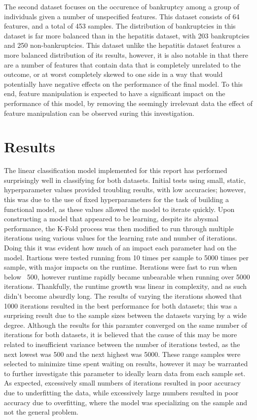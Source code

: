The second dataset focuses on the occurence of bankruptcy among a group of individuals given a number of unspecified features. This dataset consists of 64 features, and a total of 453 samples. The distribution of bankruptcies in this dataset is far more balanced than in the hepatitis dataset, with 203 bankruptcies and 250 non-bankruptcies. This dataset unlike the hepatitis dataset features a more balanced distribution of its results, however, it is also notable in that there are a number of features that contain data that is completely unrelated to the outcome, or at worst completely skewed to one side in a way that would potentially have negative effects on the performance of the final model. To this end, feature manipulation is expected to have a significant impact on the performance of this model, by removing the seemingly irrelevant data the effect of feature manipulation can be observed suring this investigation.

\section{Results}

The linear classification model implemented for this report has performed surprisingly well in classifying for both datasets. Initial tests using small, static, hyperparameter values provided troubling results, with low accuracies; however, this was due to the use of fixed hyperparameters for the task of building a functional model, as these values allowed the model to iterate quickly. Upon constructing a model that appeared to be learning, despite its abysmal performance, the K-Fold process was then modified to run through multiple iterations using various values for the learning rate and number of iterations. Doing this it was evident how much of an impact each parameter had on the model. Itartions were tested running from 10 times per sample to 5000 times per sample, with major impacts on the runtime. Iterations were fast to run when below ~500, however runtime rapidly became unbearable when running over 5000 iterations. Thankfully, the runtime growth was linear in complexity, and as such didn't become absurdly long. The results of varying the iterations showed that 1000 iterations resulted in the best performance for both datasets; this was a surprising result due to the sample sizes between the datasets varying by a wide degree. Although the results for this paramter converged on the same number of iterations for both datasets, it is believed that the cause of this may be more related to insufficient variance between the number of iterations tested, as the next lowest was 500 and the next highest was 5000. These range samples were selected to minimize time spent waiting on results, however it may be warranted to further investigate this parameter to ideally learn data from each sample set. As expected, excessively small numbers of iterations resulted in poor accuracy due to underfitting the data, while excessively large numbers resulted in poor accuracy due to overfitting, where the model was specializing on the sample and not the general problem.\\

